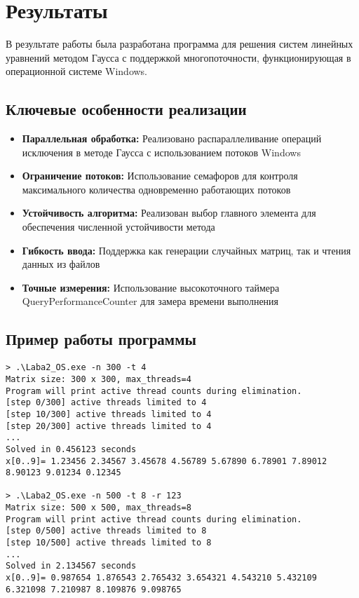 \section{Результаты}

В результате работы была разработана программа для решения систем линейных уравнений методом Гаусса с поддержкой многопоточности, функционирующая в операционной системе Windows.

\subsection{Ключевые особенности реализации}

\begin{itemize}
    \item \textbf{Параллельная обработка:} Реализовано распараллеливание операций исключения в методе Гаусса с использованием потоков Windows
    \item \textbf{Ограничение потоков:} Использование семафоров для контроля максимального количества одновременно работающих потоков
    \item \textbf{Устойчивость алгоритма:} Реализован выбор главного элемента для обеспечения численной устойчивости метода
    \item \textbf{Гибкость ввода:} Поддержка как генерации случайных матриц, так и чтения данных из файлов
    \item \textbf{Точные измерения:} Использование высокоточного таймера QueryPerformanceCounter для замера времени выполнения
\end{itemize}

\subsection{Пример работы программы}

\begin{verbatim}
> .\Laba2_OS.exe -n 300 -t 4
Matrix size: 300 x 300, max_threads=4
Program will print active thread counts during elimination.
[step 0/300] active threads limited to 4
[step 10/300] active threads limited to 4
[step 20/300] active threads limited to 4
...
Solved in 0.456123 seconds
x[0..9]= 1.23456 2.34567 3.45678 4.56789 5.67890 6.78901 7.89012 8.90123 9.01234 0.12345

> .\Laba2_OS.exe -n 500 -t 8 -r 123
Matrix size: 500 x 500, max_threads=8
Program will print active thread counts during elimination.
[step 0/500] active threads limited to 8
[step 10/500] active threads limited to 8
...
Solved in 2.134567 seconds
x[0..9]= 0.987654 1.876543 2.765432 3.654321 4.543210 5.432109 6.321098 7.210987 8.109876 9.098765
\end{verbatim}

